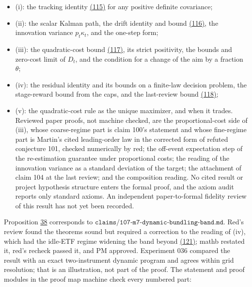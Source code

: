 \documentclass[11pt]{article}
\begin{document}
\begin{itemize}
  \item (i): the tracking identity \hyperref[eq:115]{(115)} for any positive definite covariance;
  \item (ii): the scalar Kalman path, the drift identity and bound \hyperref[eq:116]{(116)}, the
  innovation variance \(p_t\kappa_t\), and the one-step form;
  \item (iii): the quadratic-cost bound \hyperref[eq:117]{(117)}, its strict positivity, the
  bounds and zero-cost limit of \(D_t\), and the condition for a change
  of the aim by a fraction \(\theta\);
  \item (iv): the residual identity and its bounds on a finite-law decision
  problem, the stage-reward bound from the caps, and the last-review
  bound \hyperref[eq:118]{(118)};
  \item (v): the quadratic-cost rule as the unique maximizer, and when it
  trades.
Reviewed paper proofs, not machine checked, are the proportional-cost
side of (iii), whose coarse-regime part is claim 100's statement and
whose fine-regime part is Martin's cited leading-order law in the
corrected form of refuted conjecture 101, checked numerically by red; the
off-event expectation step of the re-estimation guarantee under
proportional costs; the reading of the innovation variance as a
standard deviation of the target; the attachment of claim 104 at the
last review; and the composition reading. No cited result or project
hypothesis structure enters the formal proof, and the axiom audit
reports only standard axioms. An independent paper-to-formal fidelity
review of this result has not yet been recorded.
\end{itemize}

Proposition \hyperref[res:Proposition-38]{38} corresponds to
\(\texttt{claims/107-m7-dynamic-bundling-band.md}\). Red's review found the
theorems sound but required a correction to the reading of (iv), which
had the idle-ETF regime widening the band beyond \hyperref[eq:121]{(121)}; mathb restated
it, red's recheck passed it, and PM approved. Experiment 036 compared
the result with an exact two-instrument dynamic program and agrees
within grid resolution; that is an illustration, not part of the
proof. The statement and proof modules in the proof map machine check
every numbered part:
\end{document}
